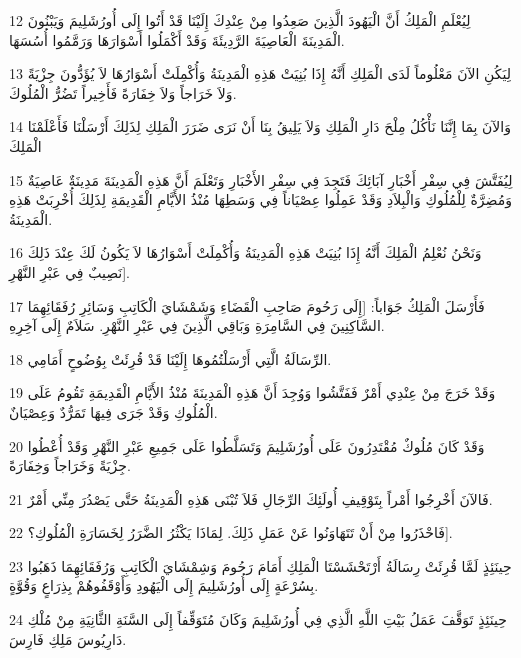 \par 12 لِيُعْلَمِ الْمَلِكُ أَنَّ الْيَهُودَ الَّذِينَ صَعِدُوا مِنْ عِنْدِكَ إِلَيْنَا قَدْ أَتُوا إِلَى أُورُشَلِيمَ وَيَبْنُونَ الْمَدِينَةَ الْعَاصِيَةَ الرَّدِيئَةَ وَقَدْ أَكْمَلُوا أَسْوَارَهَا وَرَمَّمُوا أُسُسَهَا.
\par 13 لِيَكُنِ الآنَ مَعْلُوماً لَدَى الْمَلِكِ أَنَّهُ إِذَا بُنِيَتْ هَذِهِ الْمَدِينَةُ وَأُكْمِلَتْ أَسْوَارُهَا لاَ يُؤَدُّونَ جِزْيَةً وَلاَ خَرَاجاً وَلاَ خِفَارَةً فَأَخِيراً تَضُرُّ الْمُلُوكَ.
\par 14 وَالآنَ بِمَا إِنَّنَا نَأْكُلُ مِلْحَ دَارِ الْمَلِكِ وَلاَ يَلِيقُ بِنَا أَنْ نَرَى ضَرَرَ الْمَلِكِ لِذَلِكَ أَرْسَلْنَا فَأَعْلَمْنَا الْمَلِكَ
\par 15 لِيُفَتَّشَ فِي سِفْرِ أَخْبَارِ آبَائِكَ فَتَجِدَ فِي سِفْرِ الأَخْبَارِ وَتَعْلَمَ أَنَّ هَذِهِ الْمَدِينَةَ مَدِينَةٌ عَاصِيَةٌ وَمُضِرَّةٌ لِلْمُلُوكِ وَالْبِلاَدِ وَقَدْ عَمِلُوا عِصْيَاناً فِي وَسَطِهَا مُنْذُ الأَيَّامِ الْقَدِيمَةِ لِذَلِكَ أُخْرِبَتْ هَذِهِ الْمَدِينَةُ.
\par 16 وَنَحْنُ نُعْلِمُ الْمَلِكَ أَنَّهُ إِذَا بُنِيَتْ هَذِهِ الْمَدِينَةُ وَأُكْمِلَتْ أَسْوَارُهَا لاَ يَكُونُ لَكَ عِنْدَ ذَلِكَ نَصِيبٌ فِي عَبْرِ النَّهْرِ].
\par 17 فَأَرْسَلَ الْمَلِكُ جَوَاباً: [إِلَى رَحُومَ صَاحِبِ الْقَضَاءِ وَشَمْشَايَ الْكَاتِبِ وَسَائِرِ رُفَقَائِهِمَا السَّاكِنِينَ فِي السَّامِرَةِ وَبَاقِي الَّذِينَ فِي عَبْرِ النَّهْرِ. سَلاَمٌ إِلَى آخِرِهِ.
\par 18 الرِّسَالَةُ الَّتِي أَرْسَلْتُمُوهَا إِلَيْنَا قَدْ قُرِئَتْ بِوُضُوحٍ أَمَامِي.
\par 19 وَقَدْ خَرَجَ مِنْ عِنْدِي أَمْرٌ فَفَتَّشُوا وَوُجِدَ أَنَّ هَذِهِ الْمَدِينَةَ مُنْذُ الأَيَّامِ الْقَدِيمَةِ تَقُومُ عَلَى الْمُلُوكِ وَقَدْ جَرَى فِيهَا تَمَرُّدٌ وَعِصْيَانٌ.
\par 20 وَقَدْ كَانَ مُلُوكٌ مُقْتَدِرُونَ عَلَى أُورُشَلِيمَ وَتَسَلَّطُوا عَلَى جَمِيعِ عَبْرِ النَّهْرِ وَقَدْ أُعْطُوا جِزْيَةً وَخَرَاجاً وَخِفَارَةً.
\par 21 فَالآنَ أَخْرِجُوا أَمْراً بِتَوْقِيفِ أُولَئِكَ الرِّجَالِ فَلاَ تُبْنَى هَذِهِ الْمَدِينَةُ حَتَّى يَصْدُرَ مِنِّي أَمْرٌ.
\par 22 فَاحْذَرُوا مِنْ أَنْ تَتَهَاوَنُوا عَنْ عَمَلِ ذَلِكَ. لِمَاذَا يَكْثُرُ الضَّرَرُ لِخَسَارَةِ الْمُلُوكِ؟].
\par 23 حِينَئِذٍ لَمَّا قُرِئَتْ رِسَالَةُ أَرْتَحْشَسْتَا الْمَلِكِ أَمَامَ رَحُومَ وَشِمْشَايَ الْكَاتِبِ وَرُفَقَائِهِمَا ذَهَبُوا بِسُرْعَةٍ إِلَى أُورُشَلِيمَ إِلَى الْيَهُودِ وَأَوْقَفُوهُمْ بِذِرَاعٍ وَقُوَّةٍ.
\par 24 حِينَئِذٍ تَوَقَّفَ عَمَلُ بَيْتِ اللَّهِ الَّذِي فِي أُورُشَلِيمَ وَكَانَ مُتَوَقِّفاً إِلَى السَّنَةِ الثَّانِيَةِ مِنْ مُلْكِ دَارِيُوسَ مَلِكِ فَارِسَ.


